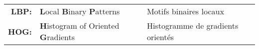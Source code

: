 \begin{center}
\normalsize 	
\begin{tabular}{rll}
\textbf{LBP:}  & \textbf{L}ocal \textbf{B}inary \textbf{P}atterns & Motifs binaires locaux\\
\textbf{HOG:}  & \textbf{H}istogram of O\textbf{}riented \textbf{G}radients & Histogramme de gradients orientés
\end{tabular}
\end{center}





